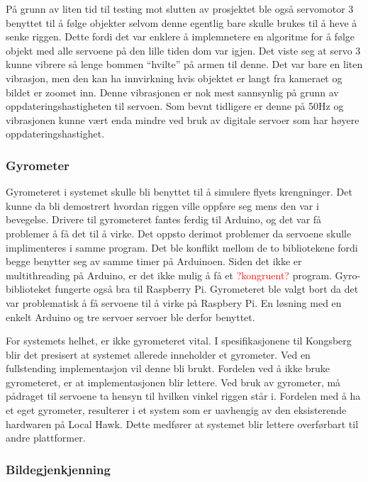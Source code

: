 På grunn av liten tid til testing mot slutten av prosjektet ble også servomotor 3 benyttet til å følge objekter selvom denne egentlig bare skulle brukes til å heve å senke riggen. Dette fordi det var enklere å implemnetere en algoritme for å følge objekt med alle servoene på den lille tiden dom var igjen. Det viste seg at servo 3 kunne vibrere så lenge bommen ``hvilte'' på armen til denne. Det var bare en liten vibrasjon, men den kan ha innvirkning hvis objektet er langt fra kameraet og bildet er zoomet inn. Denne vibrasjonen er nok mest sannsynlig på grunn av oppdateringshastigheten til servoen. Som bevnt tidligere er denne på 50Hz og vibrasjonen kunne vært enda mindre ved bruk av digitale servoer som har høyere oppdateringshastighet.  
   

\subsubsection{Gyrometer}
Gyrometeret i systemet skulle bli benyttet til å simulere flyets krengninger. Det kunne da bli demostrert hvordan riggen ville oppføre seg mens den var i bevegelse. Drivere til gyrometeret fantes ferdig til Arduino, og det var få problemer å få det til å virke. Det oppsto derimot problemer da servoene skulle implimenteres i samme program. Det ble konflikt mellom de to bibliotekene fordi begge benytter seg av samme timer på Arduinoen. Siden det ikke er multithreading på Arduino, er det ikke mulig å få et \textcolor{red}{?kongruent?} program. Gyro-biblioteket fungerte også bra til Raspberry Pi. Gyrometeret ble valgt bort da det var problematisk å få servoene til å virke på Raspbery Pi. En løsning med en enkelt Arduino og tre servoer servoer ble derfor benyttet. 

For systemets helhet, er ikke gyrometeret vital. I spesifikasjonene til Kongsberg blir det presisert at systemet allerede inneholder et gyrometer. Ved en fullstending implementasjon vil denne bli brukt. Fordelen ved å ikke bruke gyrometeret, er at implementasjonen blir lettere. Ved bruk av gyrometer, må pådraget til servoene ta hensyn til hvilken vinkel riggen står i. Fordelen med å ha et eget gyrometer, resulterer i et system som er uavhengig av den eksisterende hardwaren på Local Hawk. Dette medfører at systemet blir lettere overførbart til andre plattformer.

\subsubsection{Bildegjenkjenning}


